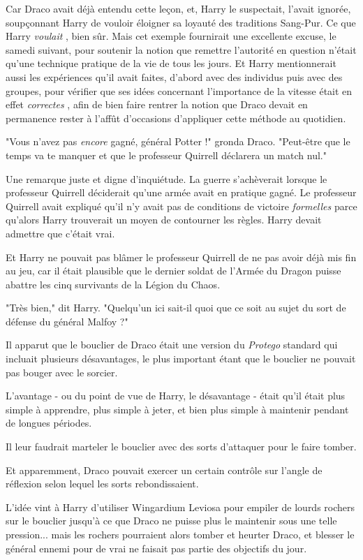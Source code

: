 Car Draco avait déjà entendu cette leçon, et, Harry le suspectait, l'avait ignorée, soupçonnant Harry de vouloir éloigner sa loyauté des traditions Sang-Pur. Ce que Harry \emph{voulait} , bien sûr. Mais cet exemple fournirait une excellente excuse, le samedi suivant, pour soutenir la notion que remettre l'autorité en question n'était qu'une technique pratique de la vie de tous les jours. Et Harry mentionnerait aussi les expériences qu'il avait faites, d'abord avec des individus puis avec des groupes, pour vérifier que ses idées concernant l'importance de la vitesse était en effet \emph{correctes} , afin de bien faire rentrer la notion que Draco devait en permanence rester à l'affût d'occasions d'appliquer cette méthode au quotidien.

"Vous n'avez pas \emph{encore}  gagné, général Potter !" gronda Draco. "Peut-être que le temps va te manquer et que le professeur Quirrell déclarera un match nul."

Une remarque juste et digne d'inquiétude. La guerre s'achèverait lorsque le professeur Quirrell déciderait qu'une armée avait en pratique gagné. Le professeur Quirrell avait expliqué qu'il n'y avait pas de conditions de victoire \emph{formelles}  parce qu'alors Harry trouverait un moyen de contourner les règles. Harry devait admettre que c'était vrai.

Et Harry ne pouvait pas blâmer le professeur Quirrell de ne pas avoir déjà mis fin au jeu, car il était plausible que le dernier soldat de l'Armée du Dragon puisse abattre les cinq survivants de la Légion du Chaos.

"Très bien," dit Harry. "Quelqu'un ici sait-il quoi que ce soit au sujet du sort de défense du général Malfoy ?"

Il apparut que le bouclier de Draco était une version du \emph{Protego}  standard qui incluait plusieurs désavantages, le plus important étant que le bouclier ne pouvait pas bouger avec le sorcier.

L'avantage - ou du point de vue de Harry, le désavantage - était qu'il était plus simple à apprendre, plus simple à jeter, et bien plus simple à maintenir pendant de longues périodes.

Il leur faudrait marteler le bouclier avec des sorts d'attaquer pour le faire tomber.

Et apparemment, Draco pouvait exercer un certain contrôle sur l'angle de réflexion selon lequel les sorts rebondissaient.

L'idée vint à Harry d'utiliser Wingardium Leviosa pour empiler de lourds rochers sur le bouclier jusqu'à ce que Draco ne puisse plus le maintenir sous une telle pression... mais les rochers pourraient alors tomber et heurter Draco, et blesser le général ennemi pour de vrai ne faisait pas partie des objectifs du jour.

